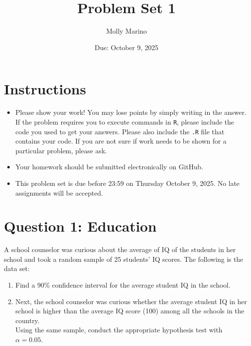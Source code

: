 \documentclass[12pt,letterpaper]{article}
\title{Problem Set 1}
\date{Due: October 9, 2025}
\author{Molly Marino}
\begin{document}
	\maketitle
	
	\section*{Instructions}
	\begin{itemize}
	\item Please show your work! You may lose points by simply writing in the answer. If the problem requires you to execute commands in \texttt{R}, please include the code you used to get your answers. Please also include the \texttt{.R} file that contains your code. If you are not sure if work needs to be shown for a particular problem, please ask.
\item Your homework should be submitted electronically on GitHub.
\item This problem set is due before 23:59 on Thursday October 9, 2025. No late assignments will be accepted.
	\end{itemize}
	
	\vspace{1cm}
	\section*{Question 1: Education}

A school counselor was curious about the average of IQ of the students in her school and took a random sample of 25 students' IQ scores. The following is the data set:\\
\vspace{.5cm}



\vspace{1cm}

\begin{enumerate}
	\item Find a 90\% confidence interval for the average student IQ in the school.\\
	
	
	\item Next, the school counselor was curious  whether  the average student IQ in her school is higher than the average IQ score (100) among all the schools in the country.\\ 
	
	\noindent Using the same sample, conduct the appropriate hypothesis test with $\alpha=0.05$.
	  
	
\end{enumerate}
\end{document}
